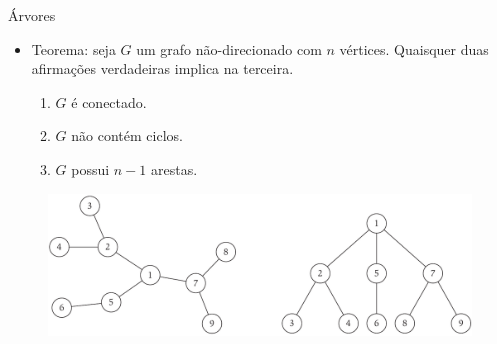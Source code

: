 \begin{frame}{Árvores}

	\begin{itemize}
		\item {\color{magenta}Teorema:} seja $G$ um grafo não-direcionado com $n$ vértices. Quaisquer duas afirmações verdadeiras implica na terceira.
		\begin{enumerate}
			\item $G$ é conectado.
			\item $G$ não contém ciclos.
			\item $G$ possui $n - 1$ arestas.
		\end{enumerate}
	\end{itemize}
	
	\begin{figure}
		\centering
		\includegraphics[width=0.85\linewidth]{img/arvores}
	\end{figure}
\end{frame}



